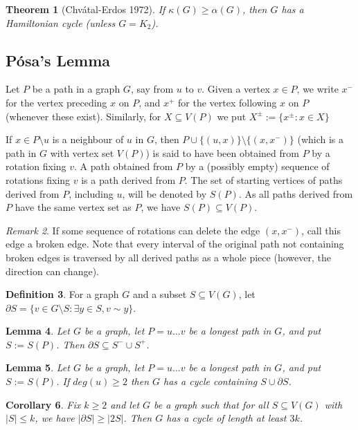 \documentclass[11pt, fleqn, a4paper, landscape]{article}
\theoremstyle{plain} %
\newtheorem{thm}{Theorem}
\newtheorem{lem}[thm]{Lemma}
\newtheorem{cor}[thm]{Corollary}
\theoremstyle{remark} %
\newtheorem{rem}[thm]{Remark}
\theoremstyle{definition} %
\newtheorem{defi}[thm]{Definition}
\begin{document}
\begin{multicols}{3}
\begin{thm}[Chvátal-Erdos 1972]
If $\kappa (G)\ge\alpha(G)$, then $G$ has a Hamiltonian cycle (unless
$G = K_2$).
\end{thm}

\subsection{Pósa’s Lemma}
Let $P$ be a path in a graph $G$, say from $u$ to $v$. Given a vertex $x \in P$, we write $x^-$ for the vertex preceding $x$ on $P$, and $x^+$ for the vertex following $x$ on $P$ (whenever these exist). Similarly, for $X \subseteq V (P)$ we put $X^\pm:=\{x^\pm:x\in X\}$

If $x \in P\setminus u$ is a neighbour of $u$ in $G$, then $P \cup \{(u, x)\}\setminus\{(x, x^-)\}$ (which is a path in $G$ with vertex
set $V (P)$) is said to have been obtained from $P$ by a rotation fixing $v$. A path obtained from $P$ by a (possibly empty) sequence of rotations fixing $v$ is a path derived from $P$. The set of starting vertices of paths derived from $P$, including $u$, will be denoted by $S(P)$. As all paths derived from $P$ have the same vertex set as $P$, we have $S(P) \subseteq V (P)$.

\begin{rem}
If some sequence of rotations can delete the edge $(x, x^-)$, call this edge a broken edge. Note that every interval of the original path not containing broken edges is traversed by all derived paths as a whole piece (however, the direction can change).
\end{rem}

\begin{defi}
For a graph $G$ and a subset $S \subseteq V (G)$, let $\partial S = \{v \in G\setminus S : \exists y \in  S, v\sim y\}$.
\end{defi}

\begin{lem}
Let $G$ be a graph, let $P = u \dots v$ be a longest path in $G$, and put $S := S(P)$. Then $\partial S \subseteq S^- \cup  S^+$.
\end{lem}

\begin{lem}
Let $G$ be a graph, let $P = u \dots v$ be a longest path in $G$, and put $S := S(P)$. If $deg(u) \ge 2$ then $ G$ has a cycle containing $S \cup \partial S$.
\end{lem}

\begin{cor}
Fix $k \ge 2$ and let $G$ be a graph such that for all $S \subseteq V (G)$ with $|S|\le k$, we have $|\partial S|\ge |2S|$. Then $G$ has a cycle of length at least $3k$.
\end{cor}


\end{multicols}
\end{document}
